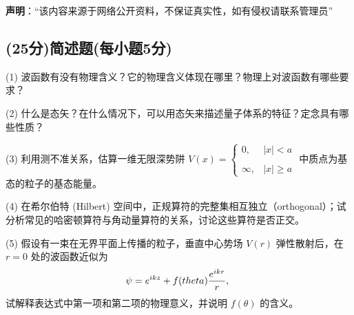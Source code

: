 
\textbf{声明}：“该内容来源于网络公开资料，不保证真实性，如有侵权请联系管理员”

\subsection{(25分)简述题(每小题5分)}

(1) 波函数有没有物理含义？它的物理含义体现在哪里？物理上对波函数有哪些要求？

(2) 什么是态矢？在什么情况下，可以用态矢来描述量子体系的特征？定念具有哪些性质？

(3) 利用测不准关系，估算一维无限深势阱 $V(x) = \begin{cases} 
0, & |x| < a \\\\
\infty, & |x| \geq a
\end{cases}$ 中质点为基态的粒子的基态能量。

(4) 在希尔伯特 (Hilbert) 空间中，正规算符的完整集相互独立（orthogonal）；试分析常见的哈密顿算符与角动量算符的关系，讨论这些算符是否正交。

(5) 假设有一束在无界平面上传播的粒子，垂直中心势场 $V(r)$ 弹性散射后，在 $r=0$ 处的波函数近似为
$$ \psi = e^{ikz} + f(\\theta) \frac{e^{ikr}}{r},~$$
试解释表达式中第一项和第二项的物理意义，并说明 $f(\theta)$ 的含义。
